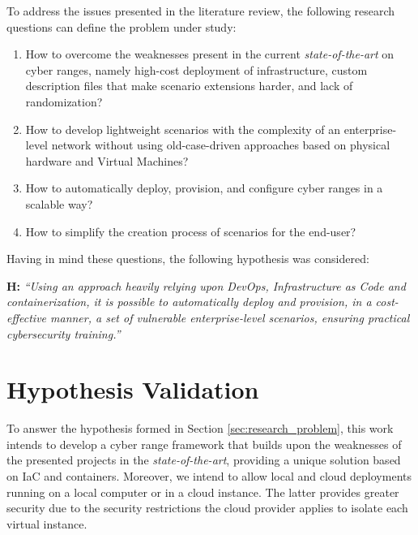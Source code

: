 To address the issues presented in the literature review, the following research questions can define the problem under study:

\begin{enumerate}
    \item How to overcome the weaknesses present in the current \textit{state-of-the-art} on cyber ranges, namely high-cost deployment of infrastructure, custom description files that make scenario extensions harder, and lack of randomization? 
    \item How to develop lightweight scenarios with the complexity of an enterprise-level network without using old-case-driven approaches based on physical hardware and Virtual Machines?
    \item How to automatically deploy, provision, and configure cyber ranges in a scalable way?
    \item How to simplify the creation process of scenarios for the end-user?
\end{enumerate}

Having in mind these questions, the following hypothesis was considered:\\

\leftskip=1.25cm\rightskip=1.25cm

\textbf{H:} \textit{``Using an approach heavily relying upon DevOps, Infrastructure as Code and containerization, it is possible to automatically deploy and provision, in a cost-effective manner, a set of vulnerable enterprise-level scenarios, ensuring practical cybersecurity training.''}

\leftskip=0cm\rightskip=0cm

\section{Hypothesis Validation} \label{sec:hypothesis_validation}

To answer the hypothesis formed in Section \ref{sec:research_problem}, this work intends to develop a cyber range framework that builds upon the weaknesses of the presented projects in the \textit{state-of-the-art}, providing a unique solution based on IaC and containers. Moreover, we intend to allow local and cloud deployments running on a local computer or in a cloud instance. The latter provides greater security due to the security restrictions the cloud provider applies to isolate each virtual instance.  

